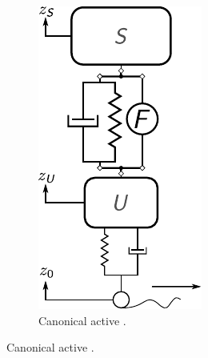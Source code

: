 \begin{figure}
\begin{subfigure}[t]{0.33\textwidth}
\includegraphics[scale=0.8]{../ch8/figures/csuspension3}
\caption{Canonical active \cite{Allison2014b, Alyaqout2007b, Fathy2003a, He2005a, Ulsoy1994a}.\label{fig:ch8:csuspension3}}
\end{subfigure}%

\vspace{0.1in}


\end{figure}
